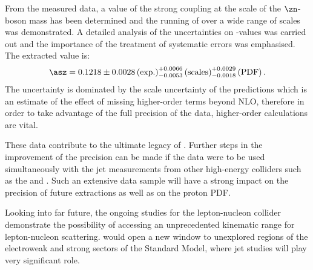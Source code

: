 From the measured data, a value of the strong coupling at the scale of the $\zn$-boson mass has been determined and the running of \as over a wide range of scales was demonstrated. A detailed analysis of the uncertainties on \asz-values was carried out and the importance of the treatment of systematic errors was emphasised. The extracted \asz value is:
\begin{equation}
 \asz = 0.1218 \pm 0.0028\left(\text{exp.}\right)^{+0.0066}_{-0.0053}\left(\text{scales}\right)^{+0.0029}_{-0.0018}\left(\text{PDF}\right).
\end{equation}
The uncertainty is dominated by the scale uncertainty of the predictions which is an estimate of the effect of missing higher-order terms beyond NLO, therefore in order to take advantage of the full precision of the data, higher-order calculations are vital. 

These data contribute to the ultimate legacy of \hera. Further steps in the improvement of the \asz precision can be made if the \hera data were to be used simultaneously with the jet measurements from other high-energy colliders such as the \lhc and \tevatron. Such an extensive data sample will have a strong impact on the precision of future \asz extractions as well as on the proton PDF.

Looking into far future, the ongoing studies for the lepton-nucleon collider \lhec demonstrate the possibility of accessing an unprecedented kinematic range for lepton-nucleon scattering. \lhec would open a new window to unexplored regions of the electroweak and strong sectors of the Standard Model, where jet studies will play very significant role.



